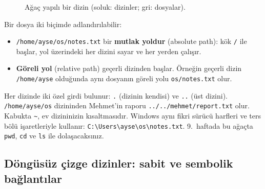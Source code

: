 \documentclass[11pt,a4paper]{article}
\newcommand{\term}[1]{\textbf{\color{mintdeep}#1}}
\newcommand{\cmd}[1]{\texttt{#1}}
\begin{document}
\begin{figure}[H]
\centering
{}
\caption{Ağaç yapılı bir dizin (soluk: dizinler; gri: dosyalar).}
\label{fig:tree}
\end{figure}

Bir dosya iki biçimde adlandırılabilir:
\begin{itemize}
  \item \texttt{/home/ayse/os/notes.txt} bir \term{mutlak yoldur} (absolute path): kök \texttt{/} ile başlar, yol üzerindeki her dizini sayar ve her yerden çalışır.
  \item \term{Göreli yol} (relative path) geçerli dizinden başlar. Örneğin geçerli dizin \texttt{/home/ayse} olduğunda aynı dosyanın göreli yolu \texttt{os/notes.txt} olur.
\end{itemize}
Her dizinde iki özel girdi bulunur: \texttt{.} (dizinin kendisi) ve \texttt{..} (üst dizini). \texttt{/\allowbreak{}home/\allowbreak{}ayse/\allowbreak{}os} dizininden Mehmet'in raporu \texttt{../\allowbreak{}../\allowbreak{}mehmet/\allowbreak{}report.txt} olur. Kabukta \texttt{\textasciitilde}, ev dizininizin kısaltmasıdır. Windows aynı fikri sürücü harfleri ve ters bölü işaretleriyle kullanır: \texttt{C:\textbackslash{}Users\textbackslash{}ayse\textbackslash{}os\textbackslash{}notes.txt}. 9.\ haftada bu ağaçta \cmd{pwd}, \cmd{cd} ve \cmd{ls} ile dolaşacaksınız.

\subsection{Döngüsüz çizge dizinler: sabit ve sembolik bağlantılar}
\label{sec:acyclic}
\end{document}
